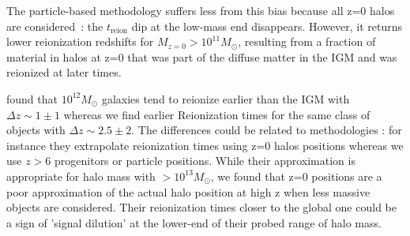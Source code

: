 \documentclass[twocolumn]{aastex61}
\begin{document}
The particle-based methodology suffers less from this bias because all z=0 halos are considered~: the $t_\mathrm{reion}$ dip at the low-mass end disappears. However, it returns lower reionization redshifts for $M_{z=0}>10^{11} M_\odot$, resulting from  a fraction of material in halos at z=0 that was part of the diffuse matter in the IGM and was reionized at later times.

\citet{LI14} found  that $10^{12} M_\odot$ galaxies tend to reionize earlier than the IGM with $\Delta z\sim 1\pm1$ whereas we find earlier Reionization times for the same class of objects with $\Delta z\sim 2.5\pm 2$. The differences could be related to methodologies : for instance they extrapolate reionization times using z=0 halos positions whereas we use $z>6$ progenitors or particle positions. While their approximation is appropriate for halo mass with $>10^{13} M_\odot$, we found that z=0 positions are a poor approximation of the actual halo position at high z when less massive objects are considered. Their reionization times closer to the global one could be a sign of 'signal dilution' at the lower-end of their probed range of halo mass. 
\end{document}
